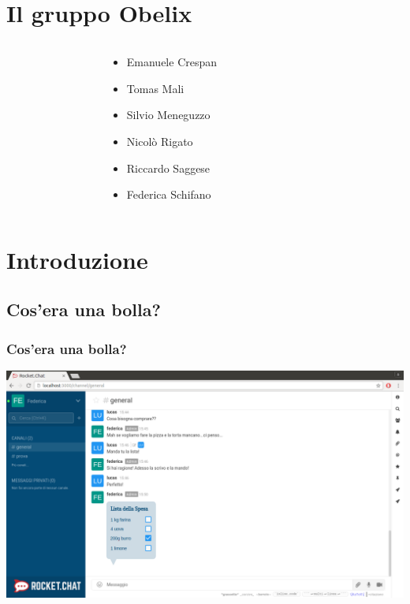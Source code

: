 \section{Il gruppo Obelix}
\begin{frame}
	
	\begin{columns}
		\begin{column}{0.2\textwidth}
			
		\end{column}
		
		\begin{column}{0.4\textwidth}
			\begin{itemize}
				\item Emanuele Crespan
				\item Tomas Mali
				\item Silvio Meneguzzo
				\item Nicolò Rigato
				\item Riccardo Saggese
				\item Federica Schifano
			\end{itemize}
		\end{column}
		
		\begin{column}{0.2\textwidth}
			
		\end{column}
	\end{columns}


\end{frame}

\section{Introduzione}
\subsection{Cos'era una bolla?}
\begin{frame}
	\frametitle{Cos'era una bolla?}
	\begin{center}
		\includegraphics[scale=0.23]{img/f1.png}
	\end{center}
	
\end{frame}

